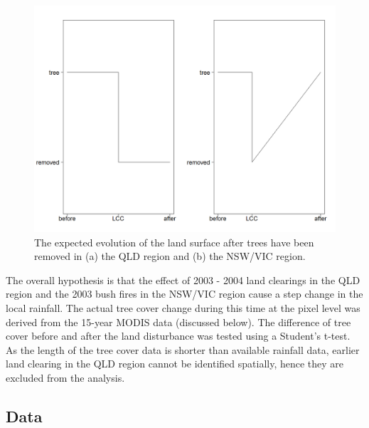 \documentclass[fleqn,10pt,lineno]{wlpeerj} %
\begin{document}
\begin{figure}
\includegraphics[width=0.9\linewidth]{figures/tc_simple} \caption{The expected evolution of the land surface after trees have been removed in (a) the QLD region and (b) the NSW/VIC region.}\label{fig:figure3-tc-simple}
\end{figure}

The overall hypothesis is that the effect of 2003 - 2004 land clearings
in the QLD region and the 2003 bush fires in the NSW/VIC region cause a
step change in the local rainfall. The actual tree cover change during
this time at the pixel level was derived from the 15-year MODIS data
(discussed below). The difference of tree cover before and after the
land disturbance was tested using a Student's t-test. As the length of
the tree cover data is shorter than available rainfall data, earlier
land clearing in the QLD region cannot be identified spatially, hence
they are excluded from the analysis.

\hypertarget{Data}{\subsection{Data}\label{Data}}
\end{document}
